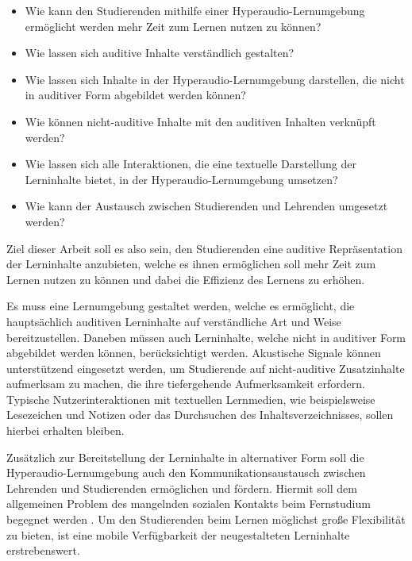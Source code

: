 \begin{itemize}
\item Wie kann den Studierenden mithilfe einer Hyperaudio-Lernumgebung ermöglicht werden mehr Zeit zum Lernen nutzen zu können?
\item Wie lassen sich auditive Inhalte verständlich gestalten?
\item Wie lassen sich Inhalte in der Hyperaudio-Lernumgebung darstellen, die nicht in auditiver Form abgebildet werden können?
\item Wie können nicht-auditive Inhalte mit den auditiven Inhalten verknüpft werden?
\item Wie lassen sich alle Interaktionen, die eine textuelle Darstellung der Lerninhalte bietet, in der Hyperaudio-Lernumgebung umsetzen?
\item Wie kann der Austausch zwischen Studierenden und Lehrenden umgesetzt werden?
\end{itemize}

Ziel dieser Arbeit soll es also sein, den Studierenden eine auditive Repräsentation der Lerninhalte anzubieten, welche es ihnen ermöglichen soll mehr Zeit zum Lernen nutzen zu können und dabei die Effizienz des Lernens zu erhöhen. 

Es muss eine Lernumgebung gestaltet werden, welche es ermöglicht, die hauptsächlich auditiven Lerninhalte auf verständliche Art und Weise bereitzustellen. Daneben müssen auch Lerninhalte, welche nicht in auditiver Form abgebildet werden können, berücksichtigt werden. Akustische Signale können unterstützend eingesetzt werden, um Studierende auf nicht-auditive Zusatzinhalte aufmerksam zu machen, die ihre tiefergehende Aufmerksamkeit erfordern. Typische Nutzerinteraktionen mit textuellen Lernmedien, wie beispielsweise Lesezeichen und Notizen oder das Durchsuchen des Inhaltsverzeichnisses, sollen hierbei erhalten bleiben.

Zusätzlich zur Bereitstellung der Lerninhalte in alternativer Form soll die Hyperaudio-Lernumgebung auch den Kommunikationsaustausch zwischen Lehrenden und Studierenden ermöglichen und fördern. Hiermit soll dem allgemeinen Problem des mangelnden sozialen Kontakts beim Fernstudium begegnet werden \citep{kerres2002didaktische}. Um den Studierenden beim Lernen möglichst große Flexibilität zu bieten, ist eine mobile Verfügbarkeit der neugestalteten Lerninhalte erstrebenswert.



